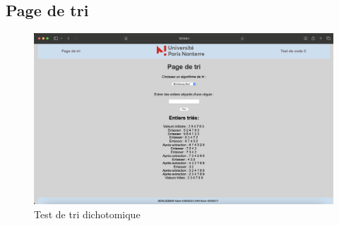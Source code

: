 \documentclass[a4paper, 12pt, twoside]{article}
\begin{document}
\subsection{Page de tri}
\begin{figure}[H]
    \centering
    \includegraphics[width=\textwidth]{tri.png}
    \caption{Test de tri dichotomique}
    \label{fig:manuel2}
\end{figure}
\end{document}
